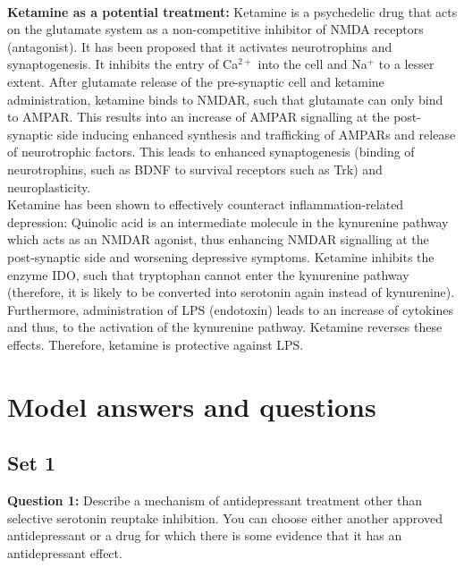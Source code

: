 \documentclass[twosided, a4paper, pt11]{article}
\begin{document}
	\paragraph{}\textbf{Ketamine as a potential treatment: }Ketamine is a psychedelic drug that acts on the glutamate system as a non-competitive inhibitor of NMDA receptors (antagonist). It has been proposed that it activates neurotrophins and synaptogenesis. It inhibits the entry of Ca$^{2+}$ into the cell and Na$^{+}$ to a lesser extent. After glutamate release of the pre-synaptic cell and ketamine administration, ketamine binds to NMDAR, such that glutamate can only bind to AMPAR. This results into an increase of AMPAR signalling at the post-synaptic side inducing enhanced synthesis and trafficking of AMPARs and release of neurotrophic factors. This leads to enhanced synaptogenesis (binding of neurotrophins, such as BDNF to survival receptors such as Trk) and neuroplasticity.\\
	Ketamine has been shown to effectively counteract inflammation-related depression: Quinolic acid is an intermediate molecule in the kynurenine pathway which acts as an NMDAR agonist, thus enhancing NMDAR signalling at the post-synaptic side and worsening depressive symptoms. Ketamine inhibits the enzyme IDO, such that tryptophan cannot enter the kynurenine pathway (therefore, it is likely to be converted into serotonin again instead of kynurenine). Furthermore, administration of LPS (endotoxin) leads to an increase of cytokines and thus, to the activation of the kynurenine pathway. Ketamine reverses these effects. Therefore, ketamine is protective against LPS.
	
	\section{Model answers and questions}
	
	\subsection{Set 1}
	\textbf{Question 1:} Describe a mechanism of antidepressant treatment other than selective serotonin reuptake inhibition. You can choose either another approved antidepressant or a drug for which there is some evidence that it has an antidepressant effect.\newline
	
\end{document}
